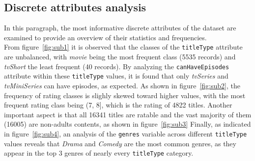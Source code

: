 \subsection{Discrete attributes analysis}
In this paragraph, the most informative discrete attributes of the dataset are examined to provide an overview of their statistics and frequencies. \\
From figure~\ref{fig:sub1} it is observed that the classes of the \texttt{titleType} attribute are unbalanced, with \textit{movie} being 
the most frequent class (5535 records) and \textit{tvShort} the least frequent (40 records). 
By analyzing the \texttt{canHaveEpisodes} attribute within these \texttt{titleType} values, it is found that only \textit{tvSeries} and 
\textit{tvMiniSeries} can have episodes, as expected.
As shown in figure~\ref{fig:sub2}, the frequency of rating classes is slighly skewed toward higher values, with the most frequent rating 
class being (7, 8], which is the rating of 4822 titles.
Another important aspect is that all 16341 titles are ratable and the vast majority of them (16005) are non-adults contents, as shown 
in figure~\ref{fig:sub3}
Finally, as indicated in figure~\ref{fig:sub4}, an analysis of the \texttt{genres} variable across different \texttt{titleType} values 
reveals that \textit{Drama} and \textit{Comedy} are the most common genres, as they appear in the top 3 genres of nearly every \texttt{titleType} category.


